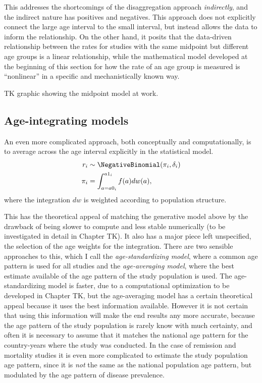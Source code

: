 This addresses the shortcomings of the disaggregation approach
\emph{indirectly}, and the indirect nature has positives and
negatives.  This approach does not explicitly connect the large age
interval to the small interval, but instead allows the data to inform
the relationship.  On the other hand, it posits that the data-driven
relationship between the rates for studies with the same midpoint but
different age groups is a linear relationship, while the mathematical
model developed at the beginning of this section for how the rate of
an age group is measured is ``nonlinear'' in a specific and
mechanistically known way.

TK graphic showing the midpoint model at work.

\subsection{Age-integrating models}
An even more complicated approach, both conceptually and
computationally, is to average across the age interval explicitly in
the statistical model.
\begin{align*}
r_i &\sim \NegativeBinomial(\pi_i, \delta_i)\\
\pi_i &= \int_{a=a0_i}^{a1_i} f(a)dw(a),
\end{align*}
where the integration $dw$ is weighted according to population
structure.

This has the theoretical appeal of matching the generative model above
by the drawback of being slower to compute and less stable numerically
(to be investigated in detail in Chapter TK).  It also has a major
piece left unspecified, the selection of the age weights for the
integration.  There are two sensible approaches to this, which I call
the \emph{age-standardizing model}, where a common age pattern is used
for all studies and the \emph{age-averaging model}, where the best
estimate available of the age pattern of the study population is
used.  The age-standardizing model is faster, due to a computational
optimization to be developed in Chapter TK, but the age-averaging
model has a certain theoretical appeal because it uses the best
information available.  However it is not certain that using this
information will make the end results any more accurate, because the
age pattern of the study population is rarely know with much
certainty, and often it is necessary to assume that it matches the
national age pattern for the country-years where the study was
conducted.  In the case of remission and mortality studies it is even
more complicated to estimate the study population age pattern, since
it is \emph{not} the same as the national population age pattern, but
modulated by the age pattern of disease prevalence.

